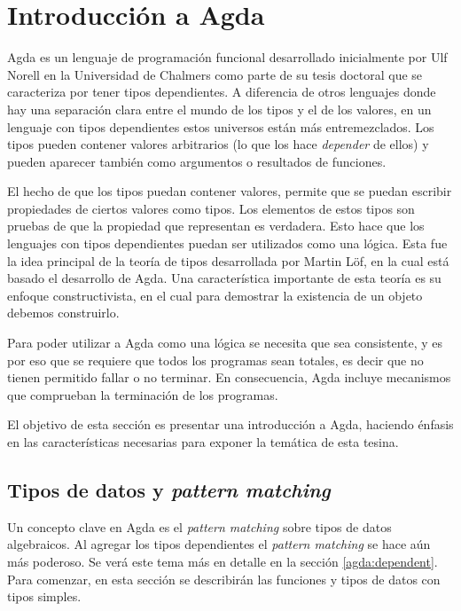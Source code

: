 \chapter{Introducci\'on a Agda} \label{chapter:agda}

Agda es un lenguaje de programación funcional desarrollado inicialmente por Ulf Norell en la Universidad de Chalmers como parte de su tesis doctoral \cite{norell:thesis} que se caracteriza por tener tipos dependientes. A diferencia de otros lenguajes donde hay una separación clara entre el mundo de los tipos y el de los valores, en un lenguaje con tipos dependientes estos universos están más entremezclados. Los tipos pueden contener valores arbitrarios (lo que los hace \textit{depender} de ellos) y pueden aparecer también como argumentos o resultados de funciones.

El hecho de que los tipos puedan contener valores, permite que se puedan escribir propiedades de ciertos valores como tipos. Los elementos de estos tipos son pruebas de que la propiedad que representan es verdadera. Esto hace que los lenguajes con tipos dependientes puedan ser utilizados como una lógica. Esta fue la idea principal de la teoría de tipos desarrollada por Martin Löf, en la cual está basado el desarrollo de Agda. Una característica importante de esta teoría es su enfoque constructivista, en el cual para demostrar la existencia de un objeto debemos construirlo.

Para poder utilizar a Agda como una lógica se necesita que sea consistente, y es por eso que se requiere que todos los programas sean totales, es decir que no tienen permitido fallar o no terminar. En consecuencia, Agda incluye mecanismos que comprueban la terminación de los programas.

El objetivo de esta sección es presentar una introducción a Agda, haciendo énfasis en las características necesarias para exponer la temática de esta tesina. 

\section{Tipos de datos y \textit{pattern matching}}\label{agda:tipos}

Un concepto clave en Agda es el \textit{pattern matching} sobre tipos de datos algebraicos. Al agregar los tipos dependientes el \textit{pattern matching} se hace aún más poderoso. Se verá este tema más en detalle en la sección \ref{agda:dependent}. Para comenzar, en esta sección se describirán las funciones y tipos de datos con tipos simples. 

